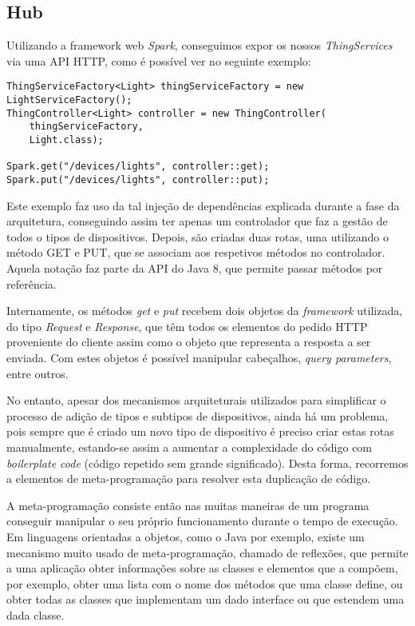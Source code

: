 \subsection{Hub}

Utilizando a framework web \textit{Spark}, conseguimos expor os nossos \textit{ThingServices} via uma API HTTP, como é possível ver no seguinte exemplo:

\begin{verbatim}
ThingServiceFactory<Light> thingServiceFactory = new LightServiceFactory();
ThingController<Light> controller = new ThingController(
    thingServiceFactory,
    Light.class);

Spark.get("/devices/lights", controller::get);
Spark.put("/devices/lights", controller::put);
\end{verbatim}

Este exemplo faz uso da tal injeção de dependências explicada durante a fase da arquitetura, conseguindo assim ter apenas um controlador que faz a gestão de todos o tipos de dispositivos. Depois, são criadas duas rotas, uma utilizando o método GET e PUT, que se associam aos respetivos métodos no controlador. Aquela notação faz parte da API do Java 8, que permite passar métodos por referência.

Internamente, os métodos \textit{get} e \textit{put} recebem dois objetos da \textit{framework} utilizada, do tipo \textit{Request} e \textit{Response}, que têm todos os elementos do pedido HTTP proveniente do cliente assim como o objeto que representa a resposta a ser enviada. Com estes objetos é possível manipular cabeçalhos, \textit{query parameters}, entre outros.

No entanto, apesar dos mecanismos arquiteturais utilizados para simplificar o processo de adição de tipos e subtipos de dispositivos, ainda há um problema, pois sempre que é criado um novo tipo de dispositivo é preciso criar estas rotas manualmente, estando-se assim a aumentar a complexidade do código com \textit{boilerplate code} (código repetido sem grande significado). Desta forma, recorremos a elementos de meta-programação para resolver esta duplicação de código.

A meta-programação consiste então nas muitas maneiras de um programa conseguir manipular o seu próprio funcionamento durante o tempo de execução. Em linguagens orientadas a objetos, como o Java por exemplo, existe um mecanismo muito usado de meta-programação, chamado de reflexões, que permite a uma aplicação obter informações sobre as classes e elementos que a compõem, por exemplo, obter uma lista com o nome dos métodos que uma classe define, ou obter todas as classes que implementam um dado interface ou que estendem uma dada classe.

